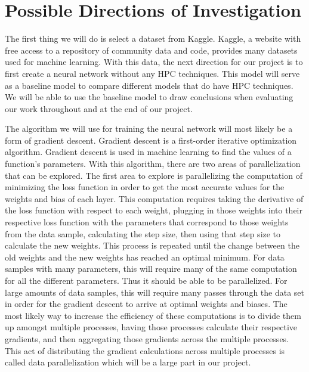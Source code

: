 \documentclass[twoside,twocolumn]{article}
\begin{document}

\section{Possible Directions of Investigation}

The first thing we will do is select a dataset from Kaggle. Kaggle, a website with free access to a repository of community data and code, provides many datasets used for machine learning. With this data, the next direction for our project is to first create a neural network without any HPC techniques. This model will serve as a baseline model to compare different models that do have HPC techniques. We will be able to use the baseline model to draw conclusions when evaluating our work throughout and at the end of our project.

The algorithm we will use for training the neural network will most likely be a form of gradient descent. Gradient descent is a first-order iterative optimization algorithm. Gradient descent is used in machine learning to find the values of a function’s parameters. With this algorithm, there are two areas of parallelization that can be explored. The first area to explore is parallelizing the computation of minimizing the loss function in order to get the most accurate values for the weights and bias of each layer. This computation requires taking the derivative of the loss function with respect to each weight, plugging in those weights into their respective loss function with the parameters that correspond to those weights from the data sample, calculating the step size, then using that step size to calculate the new weights. This process is repeated until the change between the old weights and the new weights has reached an optimal minimum. For data samples with many parameters, this will require many of the same computation for all the different parameters. Thus it should be able to be parallelized. For large amounts of data samples, this will require many passes through the data set in order for the gradient descent to arrive at optimal weights and biases. The most likely way to increase the efficiency of these computations is to divide them up amongst multiple processes, having those processes calculate their respective gradients, and then aggregating those gradients across the multiple processes. This act of distributing the gradient calculations across multiple processes is called data parallelization which will be a large part in our project.  
\end{document}
